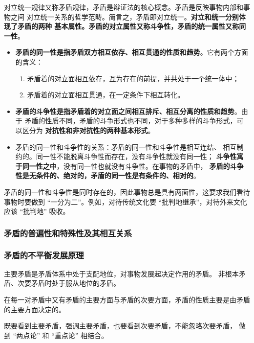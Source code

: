 \documentclass[11pt, UTF8]{book} %
\begin{document}
对立统一规律又称矛盾规律，矛盾是辩证法的核心概念。矛盾是反映事物内部和事物之间
对立统一关系的哲学范畴。简言之，矛盾即对立统一。\textbf{对立和统一分别体现了矛盾的两种
基本属性。矛盾的对立属性又称斗争性，矛盾的统一属性又称同一性}。
\begin{itemize}[itemsep=0pt]
    \item \textbf{矛盾的同一性是指矛盾双方相互依存、相互贯通的性质和趋势}。它有两个方面
    的含义：
    \begin{enumerate}[label={${\arabic*}^\circ$}, itemsep=0pt]
        \item 矛盾着的对立面相互依存，互为存在的前提，并共处于一个统一体中；
        \item 矛盾着的对立面相互贯通，在一定条件下相互转化。
    \end{enumerate}
    \item \textbf{矛盾的斗争性是指矛盾着的对立面之间相互排斥、相互分离的性质和趋势}。由于
    矛盾的性质不同，矛盾的斗争形式也不同，对于多种多样的斗争形式，可以区分为
    \textbf{对抗性和非对抗性的两种基本形式}。
    \item 矛盾的同一性和斗争性的关系：矛盾的同一性和斗争性是相互连结、
    相互制约的。同一性不能脱离斗争性而存在，没有斗争性就没有同一性；
    \textbf{斗争性寓于同一性之中}，没有同一性也就没有斗争性。在事物的矛盾中，
    \textbf{矛盾的斗争性是无条件的、绝对的，矛盾的同一性是有条件的、相对的}。
\end{itemize}
矛盾的同一性和斗争性是同时存在的，因此事物总是具有两面性，这要求我们看待
事物时要做到 “一分为二”。例如，对待传统文化要 “批判地继承”，对待外来文化应该
“批判地” 吸收。

\subsubsection{矛盾的普遍性和特殊性及其相互关系}
\subsubsection{矛盾的不平衡发展原理}

主要矛盾是矛盾体系中处于支配地位，对事物发展起决定作用的矛盾。
非根本矛盾、次要矛盾时处于服从地位的矛盾。

在每一对矛盾中又有矛盾的主要方面与矛盾的次要方面，矛盾的性质主要是由矛盾
的主要方面决定的。

既要看到主要矛盾，强调主要矛盾，也要看到次要矛盾，不能忽略次要矛盾，
做到 “两点论” 和 “重点论” 相结合。
\end{document}
